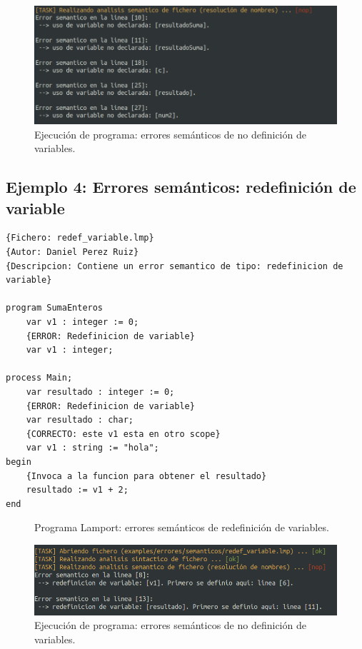 \newpage
\begin{figure}[h]
    \includegraphics[width=\linewidth]{images/ejemplos/err_semantic/undef.png}
    \caption{Ejecución de programa: errores semánticos de no definición de variables.}
    \label{fig:lamportErrSemanticUndef_exec}
\end{figure}

\newpage
\subsection{Ejemplo 4: Errores semánticos: redefinición de variable}
\begin{lstlisting}[style=lamportStyle]
{Fichero: redef_variable.lmp}
{Autor: Daniel Perez Ruiz}
{Descripcion: Contiene un error semantico de tipo: redefinicion de variable}

program SumaEnteros
	var v1 : integer := 0;
	{ERROR: Redefinicion de variable}
	var v1 : integer;

process Main;
	var resultado : integer := 0;
	{ERROR: Redefinicion de variable}
	var resultado : char;
	{CORRECTO: este v1 esta en otro scope}
	var v1 : string := "hola";
begin
	{Invoca a la funcion para obtener el resultado}
	resultado := v1 + 2;
end
\end{lstlisting}
\begin{figure}[h]
\caption{Programa Lamport: errores semánticos de redefinición de variables.}
\label{fig:lamportErrSemanticRedef}
\end{figure}

\begin{figure}[h]
    \includegraphics[width=\linewidth]{images/ejemplos/err_semantic/redef.png}
    \caption{Ejecución de programa: errores semánticos de no definición de variables.}
    \label{fig:lamportErrSemanticRedef_exec}
\end{figure}

